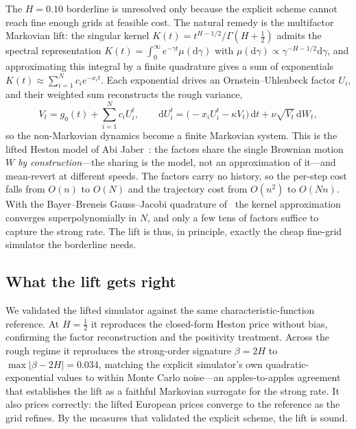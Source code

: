 \documentclass[11pt]{article}
\theoremstyle{plain}
\theoremstyle{definition}
\begin{document}
The $H=0.10$ borderline is unresolved only because the explicit scheme cannot reach fine
enough grids at feasible cost. The natural remedy is the multifactor Markovian lift: the
singular kernel $K(t)=t^{H-1/2}/\Gamma(H+\tfrac12)$ admits the spectral representation
$K(t)=\int_0^\infty e^{-\gamma t}\mu(\mathrm{d}\gamma)$ with
$\mu(\mathrm{d}\gamma)\propto \gamma^{-H-1/2}\mathrm{d}\gamma$, and approximating this
integral by a finite quadrature gives a sum of exponentials
$K(t)\approx\sum_{i=1}^N c_i e^{-x_i t}$. Each exponential drives an Ornstein--Uhlenbeck
factor $U_i$, and their weighted sum reconstructs the rough variance,
\begin{equation}
V_t = g_0(t) + \sum_{i=1}^N c_i U_i^t,
\qquad
\mathrm{d}U_i^t = \big(-x_i U_i^t - \kappa V_t\big)\,\mathrm{d}t
                 + \nu\sqrt{V_t}\,\mathrm{d}W_t,
\end{equation}
so the non-Markovian dynamics become a finite Markovian system. This is the lifted
Heston model of Abi Jaber~\cite{aj2019}: the factors share the single Brownian motion
$W$ \emph{by construction}---the sharing is the model, not an approximation of it---and
mean-revert at different speeds. The factors carry no
history, so the per-step cost falls from $O(n)$ to $O(N)$ and the trajectory cost from
$O(n^2)$ to $O(Nn)$. With the Bayer--Breneis Gauss--Jacobi quadrature of~\cite{bbf2023} the kernel approximation
converges superpolynomially in $N$, and only a few tens of factors suffice to capture the
strong rate. The lift is thus, in principle, exactly the cheap fine-grid simulator the
borderline needs.

\subsection{What the lift gets right}

We validated the lifted simulator against the same characteristic-function reference. At
$H=\tfrac12$ it reproduces the closed-form Heston price without bias, confirming the factor
reconstruction and the positivity treatment. Across the rough regime it reproduces the
strong-order signature $\beta=2H$ to $\max|\beta-2H|=0.034$, matching the explicit
simulator's own quadratic-exponential values to within Monte Carlo noise---an
apples-to-apples agreement that establishes the lift as a faithful Markovian surrogate for
the strong rate. It also prices correctly: the lifted European prices converge to the
reference as the grid refines. By the measures that validated the explicit scheme, the lift
is sound.
\end{document}

